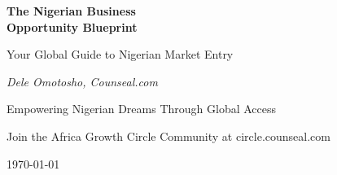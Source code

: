 \documentclass[11pt,letterpaper,openany]{book}
\newcommand{\currentdate}{\today}
\begin{document}
    \frontmatter

    \begin{titlepage}
        \centering
        \vspace*{2cm}
        {\Huge\bfseries\color{primarydark} The Nigerian Business\\Opportunity Blueprint\par}
        \vspace{1cm}
        {\Large\color{primary} Your Global Guide to Nigerian Market Entry\par}
        \vspace{2cm}
        {\Large\itshape Dele Omotosho, Counseal.com\par}
        \vspace{1cm}
        {\large Empowering Nigerian Dreams Through Global Access\par}
        \vfill
        {\large Join the Africa Growth Circle Community at circle.counseal.com\par}
        \vspace{1cm}
        {\large \currentdate\par}
    \end{titlepage}

    \tableofcontents

    \mainmatter

    
    
    
    
    
    
    
    
    
    
    

    \backmatter

    
    
    
    
    
\end{document}
